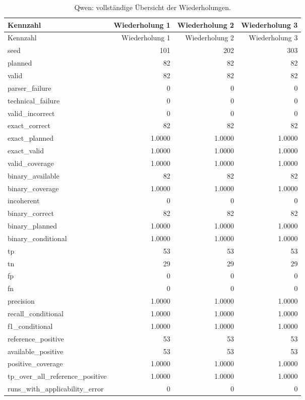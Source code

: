 \begingroup\small
\begin{longtable}{lrrr}
\caption{Qwen: vollständige Übersicht der Wiederholungen.}\label{tab_v2_repetitions_qwen}\\
\toprule
Kennzahl & Wiederholung 1 & Wiederholung 2 & Wiederholung 3 \\
\midrule
\endfirsthead
\toprule
Kennzahl & Wiederholung 1 & Wiederholung 2 & Wiederholung 3 \\
\midrule
\endhead
seed & 101 & 202 & 303 \\
planned & 82 & 82 & 82 \\
valid & 82 & 82 & 82 \\
parser\_failure & 0 & 0 & 0 \\
technical\_failure & 0 & 0 & 0 \\
valid\_incorrect & 0 & 0 & 0 \\
exact\_correct & 82 & 82 & 82 \\
exact\_planned & 1.0000 & 1.0000 & 1.0000 \\
exact\_valid & 1.0000 & 1.0000 & 1.0000 \\
valid\_coverage & 1.0000 & 1.0000 & 1.0000 \\
binary\_available & 82 & 82 & 82 \\
binary\_coverage & 1.0000 & 1.0000 & 1.0000 \\
incoherent & 0 & 0 & 0 \\
binary\_correct & 82 & 82 & 82 \\
binary\_planned & 1.0000 & 1.0000 & 1.0000 \\
binary\_conditional & 1.0000 & 1.0000 & 1.0000 \\
tp & 53 & 53 & 53 \\
tn & 29 & 29 & 29 \\
fp & 0 & 0 & 0 \\
fn & 0 & 0 & 0 \\
precision & 1.0000 & 1.0000 & 1.0000 \\
recall\_conditional & 1.0000 & 1.0000 & 1.0000 \\
f1\_conditional & 1.0000 & 1.0000 & 1.0000 \\
reference\_positive & 53 & 53 & 53 \\
available\_positive & 53 & 53 & 53 \\
positive\_coverage & 1.0000 & 1.0000 & 1.0000 \\
tp\_over\_all\_reference\_positive & 1.0000 & 1.0000 & 1.0000 \\
runs\_with\_applicability\_error & 0 & 0 & 0 \\
\bottomrule
\end{longtable}
\endgroup
